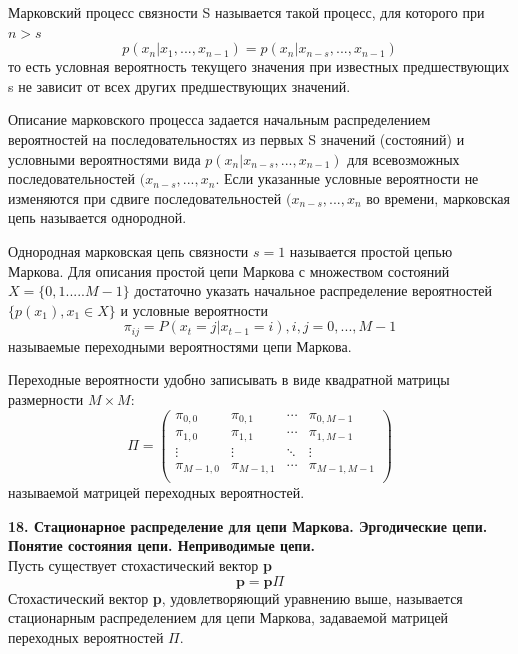 \documentclass[14pt]{article}
\begin{document}
Марковский процесс связности S называется такой процесс, для которого при \( n > s \)
\begin{displaymath}
    p(x_n|x_{1},...,x_{n-1}) = p(x_n|x_{n-s},...,x_{n-1})
\end{displaymath}
то есть условная вероятность текущего значения при известных предшествующих s не зависит от всех других предшествующих значений.

Описание марковского процесса задается начальным распределением вероятностей на последовательностях из первых S значений (состояний) и условными вероятностями вида \(p(x_n|x_{n-s},...,x_{n-1})\) для всевозможных последовательностей \((x_{n-s},...,x_n\). Если указанные условные вероятности не изменяются при сдвиге последовательностей \((x_{n-s},...,x_n\) во времени, марковская цепь называется однородной.

Однородная марковская цепь связности \(s = 1\) называется простой цепью Маркова. Для описания простой цепи Маркова с множеством состояний \(X = \{0,1.....M-1\}\) достаточно указать начальное распределение вероятностей \(\{p(x_1), x_1 \in X\}\) и условные вероятности \\
\begin{displaymath}
    \pi_{ij} = P(x_t = j|x_{t-1} = i), i,j = 0,...,M - 1
\end{displaymath}
называемые переходными вероятностями цепи Маркова.

Переходные вероятности удобно записывать в виде квадратной матрицы размерности \( M \times M \):
\begin{displaymath}
\Pi = 
 \begin{pmatrix}
  \pi_{0,0} & \pi_{0,1} & \cdots & \pi_{0,M-1} \\
  \pi_{1,0} & \pi_{1,1} & \cdots & \pi_{1,M-1} \\
  \vdots  & \vdots  & \ddots & \vdots  \\
  \pi_{M-1,0} & \pi_{M-1,1} & \cdots & \pi_{M-1,M-1} \\
 \end{pmatrix}
\end{displaymath}
называемой матрицей переходных вероятностей.

\bigskip
\textbf{18. Стационарное распределение для цепи Маркова. Эргодические цепи. Понятие состояния
цепи. Неприводимые цепи.} \\

Пусть существует стохастический вектор \textbf{p} \\
\begin{displaymath}
    \textbf{p} = \textbf{p}\Pi
\end{displaymath}
Стохастический вектор \textbf{p}, удовлетворяющий уравнению выше, называется стационарным распределением для цепи Маркова, задаваемой матрицей переходных вероятностей \(\Pi\).
\end{document}
